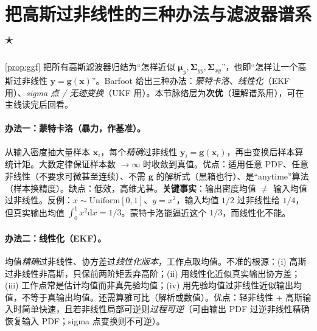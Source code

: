 \section{把高斯过非线性的三种办法与滤波器谱系 \texorpdfstring{$\star$}{(进阶)}}
\label{sec:nonlin-pdf}

\cref{prop:ggf} 把所有高斯滤波器归结为“怎样近似 $\boldsymbol{\mu}_y,\boldsymbol{\Sigma}_{yy},\boldsymbol{\Sigma}_{xy}$”，也即“怎样让一个高斯过非线性 $\mathbf{y}=\mathbf{g}(\mathbf{x})$”。Barfoot\cite{barfoot2024state} 给出三种办法：\emph{蒙特卡洛}、\emph{线性化}（EKF 用）、\emph{sigma 点 / 无迹变换}（UKF 用）。本节脉络层为\textbf{次优}（理解谱系用），可在主线读完后回看。

\paragraph{办法一：蒙特卡洛（暴力，作基准）。}
从输入密度抽大量样本 $\mathbf{x}_i$，每个\emph{精确}过非线性 $\mathbf{y}_i=\mathbf{g}(\mathbf{x}_i)$，再由变换后样本算统计矩。大数定律保证样本数 $\to\infty$ 时收敛到真值。优点：适用任意 PDF、任意非线性（不要求可微甚至连续）、不需 $\mathbf{g}$ 的解析式（黑箱也行）、是“anytime”算法（样本换精度）。缺点：低效，高维尤甚。\textbf{关键事实}：输出密度均值 $\ne$ 输入均值过非线性。反例：$x\sim\mathrm{Uniform}[0,1]$、$y=x^2$，输入均值 $1/2$ 过非线性给 $1/4$，但真实输出均值 $\int_0^1 x^2\mathrm{d}x=1/3$。蒙特卡洛能逼近这个 $1/3$，而线性化不能。

\paragraph{办法二：线性化（EKF）。}
均值\emph{精确}过非线性、协方差过\emph{线性化版本}，工作点取均值。不准的根源：(i) 高斯过非线性非高斯，只保前两阶矩丢弃高阶；(ii) 用线性化近似真实输出协方差；(iii) 工作点常是估计均值而非真先验均值；(iv) 用先验均值过非线性近似输出均值，不等于真输出均值。还需算雅可比（解析或数值）。优点：轻非线性 + 高斯输入时简单快速，且若非线性局部可逆则\emph{过程可逆}（可由输出 PDF 过逆非线性精确恢复输入 PDF；sigma 点变换则不可逆）。

